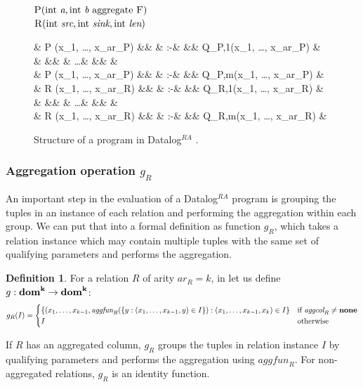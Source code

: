 \documentclass{pracamgr}
\theoremstyle{plain}
\theoremstyle{definition}
\newtheorem{defn}{Definition}[section]
\theoremstyle{remark}
\newcommand{\datalogra}{Datalog$^{RA}$ }
\newcommand{\aggfun}{\textit{aggfun} }
\newcommand{\aggcol}{\textit{aggcol} }
\newcommand{\assign}{:-}
\newcommand{\narrow}[1]{\begin{changemargin}{2cm}{2cm} #1 \end{changemargin}}
\begin{document}
\begin{figure}[h!]
\narrow{
  $\textsc{P}(\text{int } \textit{a}, \text{int } \textit{b} \text{ aggregate } \textsc{F}) $\\
  $\textsc{R}(\text{int } \textit{src}, \text{int } \textit{sink}, \text{int } \textit{len}) $ 
  \begin{flalign*}
  & \textsc{P} (x_1, \dots, x_{ar_P}) &&  & \assign & && Q_{P,1}(x_1, \dots, x_{ar_P}) & \\
  &  &&  & \dots & && & \\
  & \textsc{P} (x_1, \dots, x_{ar_P}) &&  & \assign & && Q_{P,m}(x_1, \dots, x_{ar_P}) & \\
  & \textsc{R} (x_1, \dots, x_{ar_R}) &&  & \assign & && Q_{R,1}(x_1, \dots, x_{ar_R}) & \\
  &  &&  & \dots & && & \\
  & \textsc{R} (x_1, \dots, x_{ar_R}) &&  & \assign & && Q_{R,m}(x_1, \dots, x_{ar_R}) & \\
  \end{flalign*}
  \caption{Structure of a program in \datalogra.}
}
\end{figure}

\subsubsection{Aggregation operation $g_R$}
An important step in the evaluation of a \datalogra program is grouping the tuples in an instance of each relation and performing the aggregation within each group. We can put that into a formal definition as function $g_R$, which takes a relation instance which may contain multiple tuples with the same set of qualifying parameters and performs the aggregation.
\begin{defn}\label{d:aggregationoperationgr}
For a relation $R$ of arity $ar_R = k$, in let us define $g: \bf{dom}^k \to \bf{dom}^k$:
$$
g_R(I) = \begin{cases}
\{(x_1, \dots, x_{k-1}, \aggfun_R(\{y: (x_1, \dots, x_{k-1}, y) \in I\}): (x_1, \dots, x_{k-1}, x_k) \in I\} & \text{if } \aggcol_R \ne \bf{none} \\
I & \text{otherwise}
\end{cases}
$$
\end{defn}

If $R$ has an aggregated column, $g_R$ groups the tuples in relation instance $I$ by qualifying parameters and performs the aggregation using $\aggfun_R$. For non-aggregated relations, $g_R$ is an identity function.
\end{document}
